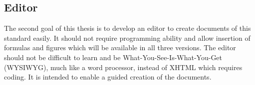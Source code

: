 \subsection{Editor}
The second goal of this thesis is to develop an editor to create documents of this standard easily. It should not require programming ability and allow insertion of formulas and figures which will be available in all three versions. The editor should not be difficult to learn and be  What-You-See-Is-What-You-Get (WYSIWYG), much like a word processor, instead of XHTML which requires coding. It is intended to enable a guided creation of the documents.